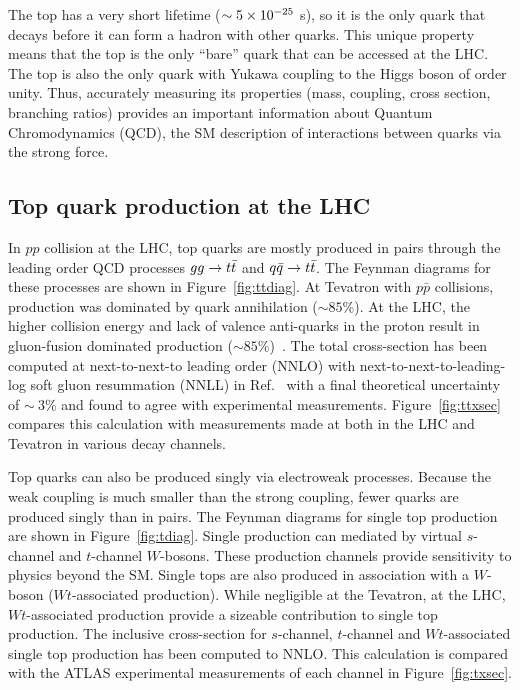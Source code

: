  The top has a very short lifetime ($\sim 5 \times 10^{-25}$ s), so it is the only quark that decays before it can form a hadron with other quarks. This unique property means that the top is the only ``bare'' quark that can be accessed at the LHC. The top is also the only quark with Yukawa coupling to the Higgs boson of order unity. Thus, accurately measuring its properties (mass, coupling, cross section, branching ratios) provides an important information about Quantum Chromodynamics (QCD), the SM description of interactions between quarks via the strong force. 


\subsection{Top quark production at the LHC}

In $pp$ collision at the LHC, top quarks are mostly produced in pairs through the leading order QCD processes  $gg \rightarrow t\bar{t}$ and $q\bar{q} \rightarrow t\bar{t}$. The Feynman diagrams for these processes are shown in Figure~\ref{fig:ttdiag}. At Tevatron with $p\bar{p}$ collisions, \ttbar production was dominated by quark annihilation ($\sim 85$\%). At the LHC, the higher collision energy and lack of valence anti-quarks in the proton result in gluon-fusion dominated \ttbar production ($\sim 85$\%)~\cite{PDG}. The total \ttbar cross-section has been computed at next-to-next-to leading order (NNLO) with next-to-next-to-leading-log soft gluon resummation (NNLL) in Ref.~\cite{Czakon:2013goa} with a final theoretical uncertainty of $\sim\ 3 \%$ and found to agree with experimental measurements. Figure~\ref{fig:ttxsec} compares this calculation with measurements made at both in the LHC and Tevatron in various decay channels.

Top quarks can also be produced singly via electroweak processes. Because the weak coupling is much smaller than the strong coupling, fewer quarks are produced singly than in pairs. The Feynman diagrams for single top production are shown in Figure~\ref{fig:tdiag}. Single production can mediated by virtual $s$-channel and $t$-channel $W$-bosons. These production channels provide sensitivity to physics beyond the SM. Single tops are also produced in association with a $W$-boson ($Wt$-associated production). While negligible at the Tevatron, at the LHC, $Wt$-associated production provide a sizeable contribution to single top production. The inclusive cross-section for $s$-channel, $t$-channel and $Wt$-associated single top production has been computed to NNLO. This calculation is compared with the ATLAS experimental measurements of each channel in Figure~\ref{fig:txsec}.

